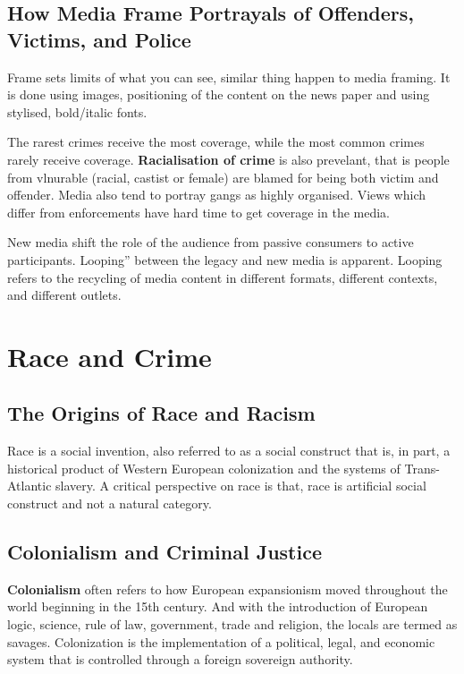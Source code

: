 \documentclass{article}
\begin{document}
\subsection{How Media Frame Portrayals of Offenders, Victims, and Police}

Frame sets limits of what you can see, similar thing happen to media framing. It is done using images, positioning of the content on the news paper and using stylised, bold/italic fonts.

The rarest crimes receive the most coverage, while the most common crimes rarely receive coverage. \textbf{Racialisation of crime} is also prevelant, that is people from vlnurable (racial, castist or female) are blamed for being both victim and offender. Media also tend to portray gangs as highly organised. Views which differ from enforcements have hard time to get coverage in the media.

New media shift the role of the audience from passive consumers to active participants. Looping” between the legacy and new media is apparent. Looping refers to the recycling of media content in different formats, different contexts, and different outlets.

\section{Race and Crime}

\subsection{The Origins of Race and Racism}

Race is a social invention, also referred to as a social construct that is, in part, a historical product of Western European colonization and the systems of Trans-Atlantic slavery.
A critical perspective on race is that, race is artificial social construct and not a natural category.

\subsection{Colonialism and Criminal Justice}

\textbf{Colonialism} often refers to how European expansionism moved throughout the world beginning in the 15th century. And with the introduction of European logic, science, rule of law, government, trade and religion, the locals are termed as savages. Colonization is the implementation of a political, legal, and economic system that is controlled through a foreign sovereign authority.
\end{document}
